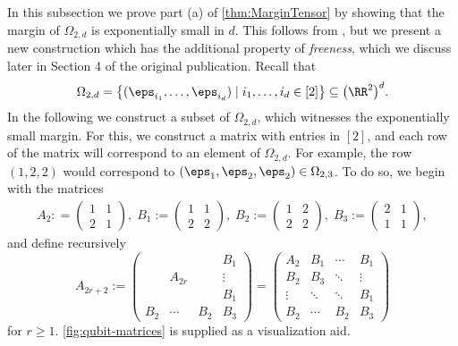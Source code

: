 In this subsection we prove part (a) of \cref{thm:MarginTensor} by showing that the margin of $\Omega_{2,d}$ is exponentially small in $d$. This follows from \cite{alon1997anti}, but we present a new construction which has the additional property of \emph{freeness}, which we discuss later in Section 4 of the original publication. Recall that 
	\begin{align*}
	\Omega_{2,d} =  \big\lbrace (\eps_{i_1}, \ldots, \eps_{i_d}) \mid i_1, \ldots, i_d \in [2] \big\rbrace \subseteq \big( \RR^2 \big)^d.
	\end{align*}
In the following we construct a subset of $\Omega_{2,d}$, which witnesses the exponentially small margin. For this, we construct a matrix with entries in $[2]$, and each row of the matrix will correspond to an element of $\Omega_{2,d}$. For example, the row $(1,2,2)$ would correspond to $(\eps_1, \eps_2, \eps_2) \in \Omega_{2,3}$. To do so, we begin with the matrices 
	\begin{align*}
	A_2 : = \begin{pmatrix} 1 & 1 \\ 2 & 1 \end{pmatrix} , \;
	B_1 := \begin{pmatrix} 1 & 1 \\ 2 & 2 \end{pmatrix} , \;
	B_2 := \begin{pmatrix} 1 & 2 \\ 2 & 2 \end{pmatrix} , \;
	B_3 := \begin{pmatrix} 2 & 1 \\ 1 & 1 \end{pmatrix} ,
	\end{align*}
and define recursively
	\begin{equation}\label{eq:defA2r}
	A_{2r+2} := \begin{pmatrix}
	  &  &  & B_1 \\ 
	  &  A_{2r} &  & \vdots \\ 
	  &  &  & B_1 \\ 
	B_2 & \cdots & B_2 & B_3
	\end{pmatrix} = 
	\begin{pmatrix}
	 A_2 & B_1 & \cdots & B_1 \\ 
	 B_2  & B_3 & \ddots & \vdots \\ 
	 \vdots & \ddots & \ddots& B_1 \\ 
	 B_2 & \cdots & B_2 & B_3
	\end{pmatrix}
	\end{equation}
for $r \geq 1$. \cref{fig:qubit-matrices} is supplied as a visualization aid.

